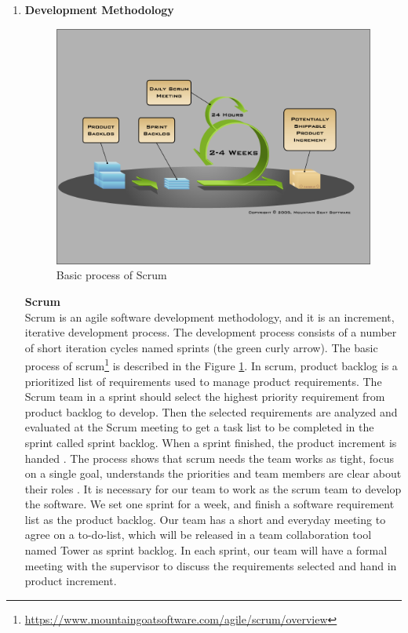 \documentclass[paper=a4, fontsize=11pt,twoside]{scrartcl}		%
\begin{document}
\begin{enumerate}

\item \textbf{Development Methodology}

\begin{figure}[htbp]
\centering
\includegraphics[width=.8\textwidth]{scrum.png}
\caption{Basic process of Scrum}
\label{scrum}
\end{figure}
	\textbf{Scrum}\\
    Scrum is an agile software development methodology, and it is an increment, iterative development process. The development process consists of a number of short iteration cycles named sprints (the green curly arrow).  The basic process of scrum\footnote{\url{https://www.mountaingoatsoftware.com/agile/scrum/overview}} is described in the Figure \ref{scrum}. In scrum, product backlog is a prioritized list of requirements used to manage product requirements. The Scrum team in a sprint should select the highest priority requirement from product backlog to develop. Then the selected requirements are analyzed and evaluated at the Scrum meeting to get a task list to be completed in the sprint called sprint backlog. When a sprint finished, the product increment is handed \cite{Scrum}. The process shows that scrum needs the team works as tight, focus on a single goal, understands the priorities and team members are clear about their roles \cite{rising2000scrum}. It is necessary for our team to work as the scrum team to develop the software. We set one sprint for a week, and finish a software requirement list as the product backlog. Our team has a short and everyday meeting to agree on a to-do-list, which will be released in a team collaboration tool named Tower as sprint backlog. In each sprint, our team will have a formal meeting with the supervisor to discuss the requirements selected and hand in product increment.
    

\end{enumerate}
\end{document}

